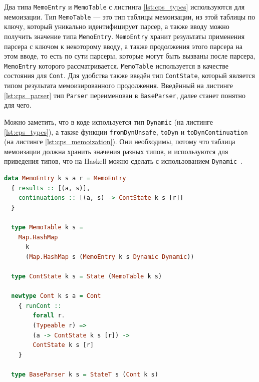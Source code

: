 \documentclass[times]{itmo-student-thesis}
\begin{document}
Два типа \lstinline{MemoEntry} и \lstinline{MemoTable} с листинга \ref{lst:cps_types} используются для мемоизации.
Тип \lstinline{MemoTable} --- это тип таблицы мемоизации, из этой таблицы по ключу, который уникально идентифицирует
парсер, а также вводу можно получить значение типа \lstinline{MemoEntry}. \lstinline{MemoEntry} хранит результаты
применения парсера с ключом к некоторому вводу, а также продолжения этого парсера на этом вводе, то есть по сути
парсеры, которые могут быть вызваны после парсера,
\lstinline{MemoEntry} которого рассматривается. \lstinline{MemoTable} используется в качестве состояния для \lstinline{Cont}. Для
удобства также введён тип \lstinline{ContState}, который является типом результата мемоизированного продолжения.
Введённый на листинге \ref{lst:cps_parser} тип \lstinline{Parser} переименован в \lstinline{BaseParser}, далее станет
понятно для чего.

Можно заметить, что в коде используется тип \lstinline{Dynamic} (на листинге \ref{lst:cps_types}), а также функции
\lstinline{fromDynUnsafe}, \lstinline{toDyn} и \lstinline{toDynContinuation} (на листинге \ref{lst:cps_memoization}).
Они необходимы, потому что таблица мемоизации должна хранить значения разных типов, и используются для приведения
типов, что на Haskell можно сделать с использованием \lstinline{Dynamic}~\cite{noauthor_datadynamic_nodate}.

\begin{lstlisting}[language=Haskell,float=!h,caption={Типы для CPS-парсера},label={lst:cps_types}]
  data MemoEntry k s a r = MemoEntry
  { results :: [(a, s)],
    continuations :: [(a, s) -> ContState k s [r]]
  }

  type MemoTable k s =
    Map.HashMap
      k
      (Map.HashMap s (MemoEntry k s Dynamic Dynamic))

  type ContState k s = State (MemoTable k s)

  newtype Cont k s a = Cont
    { runCont ::
        forall r.
        (Typeable r) =>
        (a -> ContState k s [r]) ->
        ContState k s [r]
    }

  type BaseParser k s = StateT s (Cont k s)
\end{lstlisting}
\end{document}
